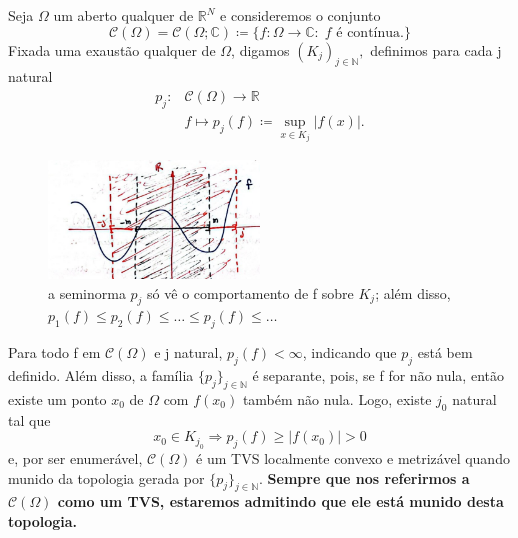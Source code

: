\documentclass[../distribution_theory_notes.tex]{subfiles}
\begin{document}
  \begin{example}
  Seja \(\Omega \) um aberto qualquer de \(\mathbb{R}^{N}\) e consideremos o conjunto 
    \[
      \mathcal{C}(\Omega )=\mathcal{C}(\Omega ; \mathbb{C})\coloneqq \{f:\Omega \rightarrow \mathbb{C}:\; f\text{ é contínua.}\}
    \]
    Fixada uma exaustão qualquer de \(\Omega \), digamos \((K_{j})_{j\in \mathbb{N}},\) definimos para cada j natural 
   \begin{align*}
     p_{j}:&\mathcal{C}(\Omega )\rightarrow \mathbb{R}\\ 
           &f\mapsto p_{j}(f)\coloneqq \sup_{x\in K_{j}}|f(x)|.
   \end{align*}
  \begin{figure}[H]
  \begin{center}
  \includegraphics[height=0.5\textheight, width=0.5\textwidth, keepaspectratio]{./Images/continuous_space_seminorm_04.png}
  \end{center}
  \caption{a seminorma \(p_{j}\) só vê o comportamento de f sobre \(K_{j}\); além disso, \(p_1(f)\leq p_2(f)\leq \dotsc \leq p_{j}(f)\leq \dotsc \)}
  \end{figure}

   Para todo f em \(\mathcal{C}(\Omega )\) e j natural, \(p_{j}(f) < \infty\), indicando que \(p_{j}\) está bem definido. Além disso, a família \(\{p_{j}\}_{j\in \mathbb{N}}\) é separante, pois, se f for não nula, então existe um ponto \(x_{0}\) de \(\Omega \) com \(f(x_{0})\) também não nula. Logo, existe \(j_{0}\) natural tal que 
     \[
       x_{0}\in K_{j_{0}} \Rightarrow p_{j}(f)\geq |f(x_{0})|>0
     \]
     e, por ser enumerável, \(\mathcal{C}(\Omega )\) é um TVS localmente convexo e metrizável quando munido da topologia gerada por \(\{p_{j}\}_{j\in \mathbb{N}}\). \textbf{Sempre que nos referirmos a \(\mathcal{C}(\Omega )\) como um TVS, estaremos admitindo que ele está munido desta topologia.}


\end{example}
\end{document}
